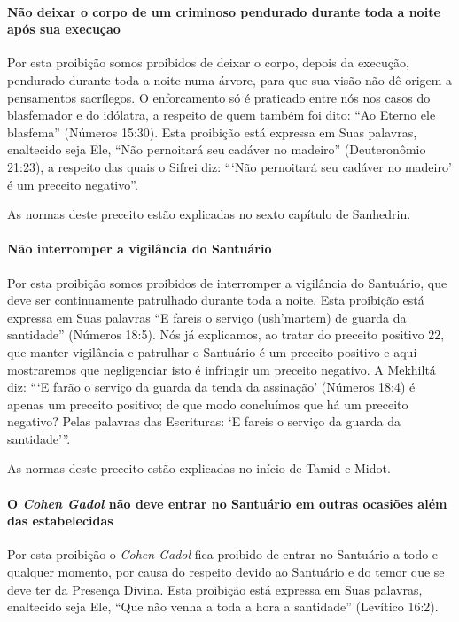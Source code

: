\paragraph{Não deixar o corpo de um criminoso pendurado durante toda a
noite após sua execuçao}

Por esta proibição somos proibidos de deixar o corpo, depois da
execução, pendurado durante toda a noite numa árvore, para que sua visão
não dê origem a pensamentos sacrílegos. O enforcamento só é praticado
entre nós nos casos do blasfemador e do idólatra, a respeito de quem
também foi dito: ``Ao Eterno ele blasfema'' (Números 15:30). Esta proibição está expressa em Suas palavras, enaltecido seja Ele, ``Não pernoitará seu cadáver no
madeiro'' (Deuteronômio 21:23), a respeito das quais o Sifrei diz:
```Não pernoitará seu cadáver no madeiro' é um preceito negativo''.

As normas deste preceito estão explicadas no sexto capítulo de Sanhedrin.

\paragraph{Não interromper a vigilância do Santuário}

Por esta proibição somos proibidos de interromper a vigilância do
Santuário, que deve ser continuamente patrulhado durante toda a noite.
Esta proibição está expressa em Suas palavras ``E fareis o serviço
(ush'martem) de guarda da santidade'' (Números 18:5). Nós já explicamos,
ao tratar do preceito positivo 22, que manter vigilância e patrulhar o
Santuário é um preceito positivo e aqui mostraremos que negligenciar
isto é infringir um preceito negativo. A Mekhiltá diz: ```E farão o
serviço da guarda da tenda da assinação' (Números 18:4) é apenas um
preceito positivo; de que modo concluímos que há um preceito negativo?
Pelas palavras das Escrituras: `E fareis o serviço da guarda da
santidade'''.

As normas deste preceito estão explicadas no início de Tamid e Midot.

\paragraph{O \textit{Cohen Gadol} não deve entrar no Santuário em outras ocasiões além das estabelecidas}

Por esta proibição o \textit{Cohen Gadol} fica proibido de entrar no
Santuário a todo e qualquer momento, por causa do respeito devido ao
Santuário e do temor que se deve ter da Presença Divina. Esta proibição
está expressa em Suas palavras, enaltecido seja Ele, ``Que não venha a
toda a hora a santidade'' (Levítico 16:2).

